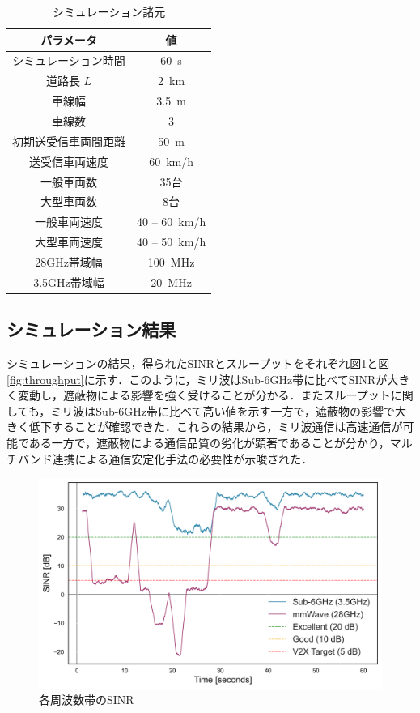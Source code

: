 \documentclass[10pt, twocolumn, a4j, platex]{jsarticle}	%
\newcommand{\wfig}[1]{図\ref{fig:#1}}%
\begin{document}
\begin{table}[tb]
	\centering
	\caption{シミュレーション諸元}
	\begin{tabular}{c|c}
		\hline
		パラメータ      & 値                   \\
		\hline
		シミュレーション時間 & \SI{60}{s}          \\
		道路長 $L$    & \SI{2}{km}          \\
		車線幅        & \SI{3.5}{m}         \\
		車線数        & 3                   \\
		初期送受信車両間距離 & \SI{50}{m}          \\
		送受信車両速度    & \SI{60}{km/h}       \\
		一般車両数      & 35台                 \\
		大型車両数      & 8台                  \\
		一般車両速度     & 40 -- \SI{60}{km/h} \\
		大型車両速度     & 40 -- \SI{50}{km/h} \\
		28GHz帯域幅   & \SI{100}{MHz}       \\
		3.5GHz帯域幅  & \SI{20}{MHz}        \\
		\hline
	\end{tabular}
	\label{tab:params}
\end{table}

\subsection{シミュレーション結果}

シミュレーションの結果，得られたSINRとスループットをそれぞれ\wfig{sinr}と\wfig{throughput}に示す．このように，ミリ波はSub-6GHz帯に比べてSINRが大きく変動し，遮蔽物による影響を強く受けることが分かる．またスループットに関しても，ミリ波はSub-6GHz帯に比べて高い値を示す一方で，遮蔽物の影響で大きく低下することが確認できた．これらの結果から，ミリ波通信は高速通信が可能である一方で，遮蔽物による通信品質の劣化が顕著であることが分かり，マルチバンド連携による通信安定化手法の必要性が示唆された．

\begin{figure}[tb]
	\centering
	\includegraphics[width=0.95\linewidth]{./images/sinr_comprehensive_analysis.png}
	\caption{各周波数帯のSINR} \label{fig:sinr}
\end{figure}
\end{document}
